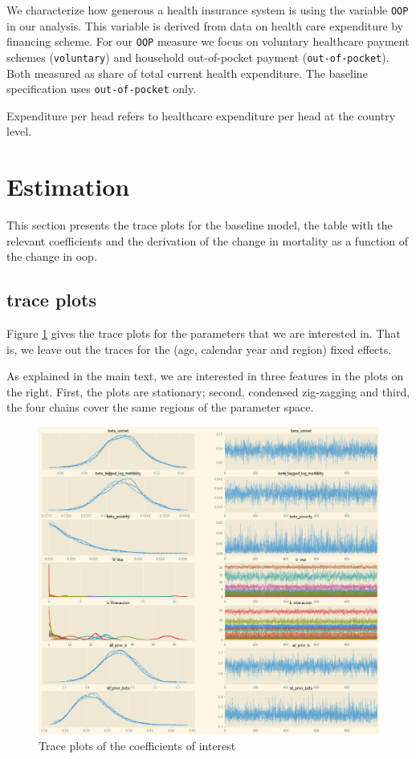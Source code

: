 \documentclass[a4paper,12pt]{article}
\begin{document}
We characterize how generous a health insurance system is using the variable \texttt{OOP} in our analysis. This variable is derived from data on health care expenditure by financing scheme. For our \texttt{OOP} measure we focus on voluntary healthcare payment schemes (\texttt{voluntary}) and household out-of-pocket payment (\texttt{out-of-pocket}). Both measured as share of total current health expenditure. The baseline specification uses \texttt{out-of-pocket} only.

Expenditure per head refers to healthcare expenditure per head at the country level.

\section{Estimation}
\label{sec:org29d9a00}

This section presents the trace plots for the baseline model, the table with the relevant coefficients and the derivation of the change in mortality as a function of the change in oop.

\subsection{trace plots}
\label{sec:org32a7aef}

Figure \ref{fig:Trace} gives the trace plots for the parameters that we are interested in. That is, we leave out the traces for the (age, calendar year and region) fixed effects.

As explained in the main text, we are interested in three features in the plots on the right. First, the plots are stationary; second, condensed zig-zagging and third, the four chains cover the same regions of the parameter space.

\begin{figure}[htbp]
\centering
\includegraphics[width=.9\linewidth]{./figures/trace_plot_baseline.png}
\caption{\label{fig:Trace}Trace plots of the coefficients of interest}
\end{figure}
\end{document}
